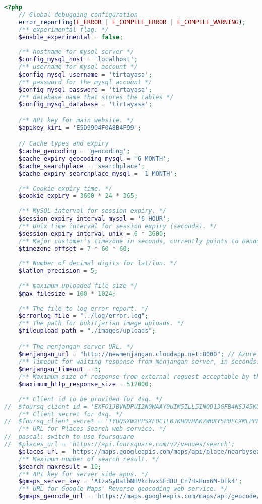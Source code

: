 \begin{lstlisting}[language=PHP,basicstyle=\tiny,caption=constants.php,label={lst:constants.php}]
<?php
	// Global debugging configuration
	error_reporting(E_ERROR | E_COMPILE_ERROR | E_COMPILE_WARNING);
	/** experimental flag. */
	$enable_experimental = false;
	
	/** hostname for mysql server */
	$config_mysql_host = 'localhost';
	/** username for mysql account */
	$config_mysql_username = 'tirtayasa';   
	/** password for the mysql account */
	$config_mysql_password = 'tirtayasa';
	/** database name that stores the tables */
	$config_mysql_database = 'tirtayasa';

	/** API key for main website. */
	$apikey_kiri = 'E5D9904F0A8B4F99';

	// Cache types and expiry
	$cache_geocoding = 'geocoding';
	$cache_expiry_geocoding_mysql = '6 MONTH';
	$cache_searchplace = 'searchplace';
	$cache_expiry_searchplace_mysql = '1 MONTH';
	
	/** Cookie expiry time. */
	$cookie_expiry = 3600 * 24 * 365;
		
	/** MySQL interval for session expiry. */
	$session_expiry_interval_mysql = '6 HOUR';
	/** Unix time interval for session expiry (seconds). */
	$session_expiry_interval_unix = 6 * 3600;
	/** Major customer's timezone in seconds, currently points to Bandung (GMT+7) */
	$timezone_offset = 7 * 60 * 60;
	
	/** Number of decimal digits for lat/lon. */ 
	$latlon_precision = 5;
	
	/** maximum uploaded file size */
	$max_filesize = 100 * 1024;
	
	/** The file to log error report. */
	$errorlog_file = "../log/error.log";
	/** The path for bukitjarian image uploads. */
	$fileupload_path = "./images/uploads";

	/** The menjangan server URL. */
	$menjangan_url = "http://newmenjangan.cloudapp.net:8000"; // Azure
	/** Timeout for waiting response from menjangan server, in seconds. */
	$menjangan_timeout = 3;
	/** Maximum size of response from external request acceptable by the script. */ 
	$maximum_http_response_size = 512000;
	
	/** Client id to be provided for 4sq. */
//	$foursq_client_id = 'EXFO1JBVNDPUI2N0WAAY0UIM5ILL5INQD13GFB4NSJ45KUQS';
	/** Client secret for 4sq. */
//	$foursq_client_secret = 'TYUQSXW2PPSXFOC1L0JKHOVHAKZWRKY5P0ECXMLPPHBMI13Y';
	/** URL for Places Search web service. */
//  pascal: switch to use foursquare
// 	$places_url = 'https://api.foursquare.com/v2/venues/search';
	$places_url = 'https://maps.googleapis.com/maps/api/place/nearbysearch/json';
	/** Maximum number of search result. */
	$search_maxresult = 10;
	/** API key for server side apps. */
	$gmaps_server_key = 'AIzaSyBa1bNBVkchvxSFd8U_Cn7HsHux6M-DIk4';
	/** URL for Google Maps' Reverse geocoding web service. */
	$gmaps_geocode_url = 'https://maps.googleapis.com/maps/api/geocode/json';
	

\end{lstlisting}
